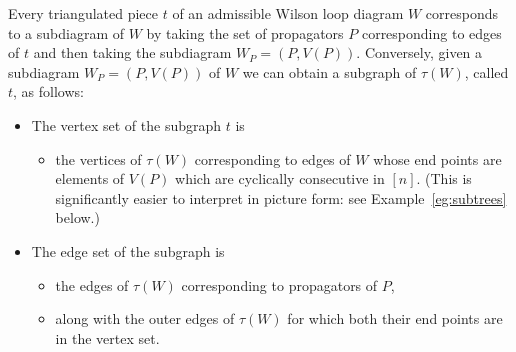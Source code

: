 \documentclass[11pt]{article}
\theoremstyle{remark}
\theoremstyle{definition}
\begin{document}
Every triangulated piece $t$ of an admissible Wilson loop diagram $W$ corresponds to a subdiagram of $W$ by taking the set of propagators $P$ corresponding to edges of $t$ and then taking the subdiagram $W_P = (P, V(P))$.  Conversely, given a subdiagram $W_P = (P, V(P))$ of $W$ we can obtain a subgraph of $\tau(W)$, called $t$, as follows:
\begin{itemize}
\item The vertex set of the subgraph $t$ is
  \begin{itemize}
  \item the vertices of $\tau(W)$ corresponding to edges of $W$ whose end points are elements of $V(P)$ which are cyclically consecutive in $[n]$. (This is significantly easier to interpret in picture form: see Example~\ref{eg:subtrees} below.)
  \end{itemize}
\item The edge set of the subgraph is
  \begin{itemize}
  \item the edges of $\tau(W)$ corresponding to propagators of $P$,
  \item along with the outer edges of $\tau(W)$ for which both their end points are in the vertex set.
  \end{itemize}
\end{itemize}
\end{document}
